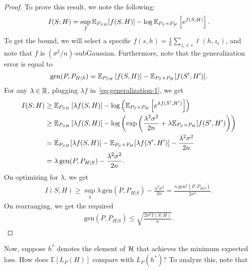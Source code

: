             \begin{proof}
                To prove this result, we note the following: 
                \begin{align}
                    I(S; H) = \sup_{f} \mathbb{E}_{P_{SH}}[f(S, H)] - \log \mathbb{E}_{P_S \times P_H}\left[ e^{f(S, H)} \right]. \label{eq:generalization-1}
                \end{align}
                To get the bound, we will select a specific $f(s, h) = \frac{1}{n} \sum_{z_i \in s} \ell(h, z_i)$, and note that $f$ is $(\sigma^2/n)$-subGaussian. Furthermore, note that the generalization error is equal to 
                \begin{align}
                    \text{gen}(P, P_{H|S}) = \mathbb{E}_{P_{SH}}\left[ f(S, H) \right] - \mathbb{E}_{P_{S} \times P_{H}}[f(S', H')]. 
                \end{align}
                For any $\lambda \in \mathbb{R}$, plugging  $\lambda f$ in~\eqref{eq:generalization-1}, we get 
                \begin{align}
                    I(S;H) &\geq \mathbb{E}_{P_{SH}}\left[ \lambda f(S, H) \right] - \log \left( \mathbb{E}_{P_S \times P_H}\left[ e^{\lambda f(S',H')} \right]  \right) \\
                    & \geq \mathbb{E}_{P_{SH}}\left[ \lambda f(S, H) \right] - \log \left( \exp \left( \frac{\lambda^2 \sigma^2}{2n} + \lambda \mathbb{E}_{P_S \times P_H}[f(S', H') \right)  \right) \\
                    & = \mathbb{E}_{P_{SH}}[\lambda f(S, H)] - \mathbb{E}_{P_{S}\times P_H}[\lambda f(S', H')] - \frac{\lambda^2 \sigma^2}{2n} \\
                    & = \lambda \, \text{gen}(P, P_{H|S}) - \frac{\lambda^2 \sigma^2}{2n}. 
                \end{align}
                On optimizing for $\lambda$, we get 
                \begin{align}
                    I(S; H) \geq \sup_{\lambda} \lambda \, \text{gen}(P, P_{H|S}) - \frac{\lambda^2 \sigma^2}{2n}  = \frac{n \, \text{gen}^2(P, P_{H|S})}{2 \sigma^2}. 
                \end{align}
                On rearranging, we get the required 
                \begin{align}
                    \text{gen}(P, P_{H|S}) \leq \sqrt{ \frac{ 2 \sigma^2 I(S; H)}{n}}. 
                \end{align}
            \end{proof}
            Now, suppose $h^*$ denotes the element of $\mathcal{H}$ that achieves the minimum expected loss. How does $\mathbb{E}[L_P(H)]$ compare with $L_P(h^*)$? To analyze this, note that
